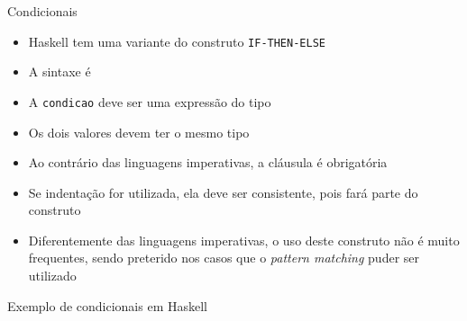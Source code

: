 \begin{frame}[fragile]{Condicionais}

    \begin{itemize}
        \item Haskell tem uma variante do construto \texttt{IF-THEN-ELSE}

        \item A sintaxe é 


        \item A \texttt{condicao} deve ser uma expressão do tipo 

        \item Os dois valores devem ter o mesmo tipo

        \item Ao contrário das linguagens imperativas, a cláusula  é 
            obrigatória

        \item Se indentação for utilizada, ela deve ser consistente, pois fará parte
            do construto

        \item Diferentemente das linguagens imperativas, o uso deste construto não é muito
            frequentes, sendo preterido nos casos que o \textit{pattern matching} puder ser
            utilizado
    \end{itemize}

\end{frame}

\begin{frame}[fragile]{Exemplo de condicionais em Haskell}


\end{frame}

